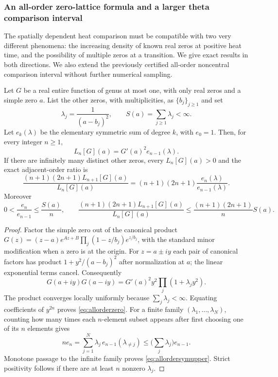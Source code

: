 \subsubsection{An all-order zero-lattice formula and a larger theta comparison interval}
\label{subsec:zero-lattice-all-orders}
The spatially dependent heat comparison must be compatible
with two very different phenomena: the increasing density
of known real zeros at positive heat time, and the
possibility of multiple zeros at a transition.
We give exact results in both directions.
We also extend the previously certified all-order
noncentral comparison interval without further numerical
sampling.

\begin{theorem}
\label{thm:zeroelementary}
Let $G$ be a real entire function of genus at most one,
with only real zeros and a simple zero $a$.
List the other zeros, with multiplicities, as
$\{b_j\}_{j\ge1}$ and set
\[
\lambda_j=\frac1{(a-b_j)^2},\qquad
S(a)=\sum_{j\ge1}\lambda_j<\infty.
\]
Let $e_k(\lambda)$ be the elementary symmetric
sum of degree $k$, with $e_0=1$.
Then, for every integer $n\ge1$,
\begin{equation}
\boxed{\quad L_n[G](a)=G'(a)^2 e_{n-1}(\lambda).\quad}
\label{eq:allorderzero}
\end{equation}
If there are infinitely many distinct other zeros, every
$L_n[G](a)>0$ and the exact adjacent-order ratio is
\begin{equation}
\frac{(n+1)(2n+1)L_{n+1}[G](a)}{L_n[G](a)}
=(n+1)(2n+1)\frac{e_n(\lambda)}{e_{n-1}(\lambda)}.
\label{eq:allorderzeroratio}
\end{equation}
Moreover
\begin{equation}
0<\frac{e_n}{e_{n-1}}\le\frac{S(a)}{n},
\qquad
\frac{(n+1)(2n+1)L_{n+1}[G](a)}
     {L_n[G](a)}
\le\frac{(n+1)(2n+1)}n S(a).
\label{eq:allordersymupper}
\end{equation}
\end{theorem}
\begin{proof}
Factor the simple zero out of the canonical product
$G(z)=(z-a)e^{Az+B}\prod_j
(1-z/b_j)e^{z/b_j}$, with the standard
minor modification when a zero is at the origin.
For $z=a\pm iy$ each pair of canonical factors
has product $1+y^2/(a-b_j)^2$ after
normalization at $a$; the linear exponential
terms cancel. Consequently
\[
G(a+iy)G(a-iy)
=G'(a)^2y^2\prod_j(1+\lambda_j y^2).
\]
The product converges locally uniformly because
$\sum_j\lambda_j<\infty$. Equating coefficients
of $y^{2n}$ proves \eqref{eq:allorderzero}.
For a finite family $(\lambda_1,\ldots,\lambda_N)$,
counting how many times each $n$-element subset
appears after first choosing one of its $n$ elements gives
\[
n e_n=\sum_{j=1}^N
\lambda_j\,e_{n-1}(\lambda_{\ne j})
\le \biggl(\sum_j\lambda_j\biggr)e_{n-1}.
\]
Monotone passage to the infinite family proves
\eqref{eq:allordersymupper}. Strict positivity follows
if there are at least $n$ nonzero $\lambda_j$.
\end{proof}

